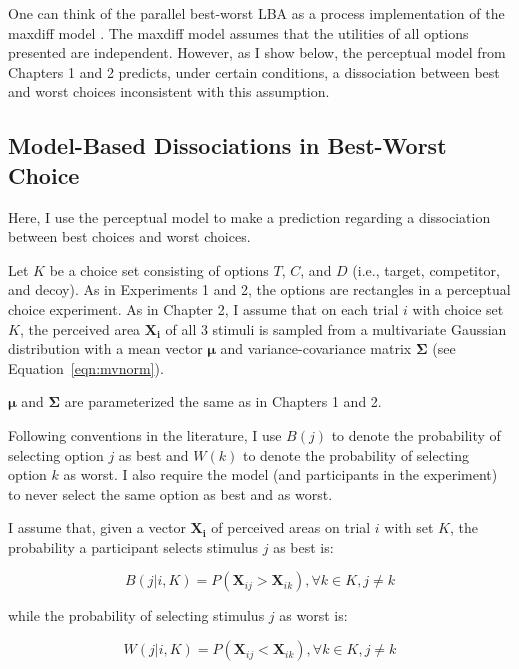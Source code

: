 One can think of the parallel best-worst LBA as a process implementation of the maxdiff model \parencite{hawkinsIntegratingCognitiveProcess2014a}. The maxdiff model assumes that the utilities of all options presented are independent. However, as I show below, the perceptual model from Chapters 1 and 2 predicts, under certain conditions, a dissociation between best and worst choices inconsistent with this assumption.

\subsection{Model-Based Dissociations in Best-Worst Choice}

Here, I use the perceptual model to make a prediction regarding a dissociation between best choices and worst choices. 

Let $K$ be a choice set consisting of options $T$, $C$, and $D$ (i.e., target, competitor, and decoy). As in Experiments 1 and 2, the options are rectangles in a perceptual choice experiment. As in Chapter 2, I assume that on each trial $i$ with choice set $K$, the perceived area $\mathbf{X_{i}}$ of all 3 stimuli is sampled from a multivariate Gaussian distribution with a mean vector $\boldsymbol{\mu}$ and variance-covariance matrix $\boldsymbol{\Sigma}$ (see Equation~\ref{eqn:mvnorm}).

$\boldsymbol{\mu}$ and $\boldsymbol{\Sigma}$ are parameterized the same as in Chapters 1 and 2. 

Following conventions in the literature, I use $B(j)$ to denote the probability of selecting option $j$ as best and $W(k)$ to denote the probability of selecting option $k$ as worst. I also require the model (and participants in the experiment) to never select the same option as best and as worst.

I assume that, given a vector $\mathbf{X_{i}}$ of perceived areas on trial $i$ with set $K$, the probability a participant selects stimulus $j$ as best is:

\begin{equation}
   B(j|i,K)=P(\mathbf{X}_{ij}>\mathbf{X}_{ik}), \forall k \in K, j \neq k
   \label{eqn:bchoice1}
\end{equation}

while the probability of selecting stimulus $j$ as worst is:

\begin{equation}
   W(j|i,K)=P(\mathbf{X}_{ij}<\mathbf{X}_{ik}), \forall k \in K, j \neq k
   \label{eqn:wchoice1}
\end{equation}

